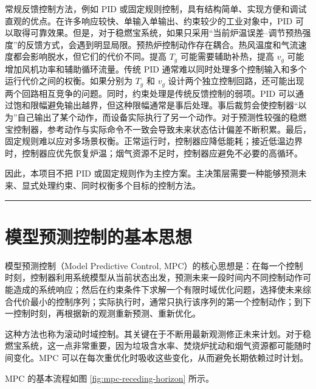 \documentclass[UTF8,openany,zihao=-4,oneside]{ctexbook}
\newcommand{\manualdivider}{\par\vspace{0.6em}\noindent\textcolor{FGLine}{\rule{\linewidth}{0.7pt}}\vspace{0.6em}\par}
\begin{document}
常规反馈控制方法，例如 PID 或固定规则控制，具有结构简单、实现方便和调试直观的优点。在许多响应较快、单输入单输出、约束较少的工业对象中，PID 可以取得可靠效果。但是，对于稳燃宝系统，如果只采用“当前炉温误差--调节预热强度”的反馈方式，会遇到明显局限。预热炉控制动作存在耦合。热风温度和气流速度都会影响脱水，但它们的代价不同。提高 \(T_g\) 可能需要辅助补热，提高 \(v_g\) 可能增加风机功率和辅助循环流量。传统 PID 通常难以同时处理多个控制输入和多个运行代价之间的权衡。如果分别为 \(T_g\) 和 \(v_g\) 设计两个独立控制回路，还可能出现两个回路相互竞争的问题。同时，约束处理是传统反馈控制的弱项。PID 可以通过饱和限幅避免输出越界，但这种限幅通常是事后处理。事后裁剪会使控制器“以为”自己输出了某个动作，而设备实际执行了另一个动作。对于预测性较强的稳燃宝控制器，参考动作与实际命令不一致会导致未来状态估计偏差不断积累。最后，固定规则难以应对多场景权衡。正常运行时，控制器应降低能耗；接近低温边界时，控制器应优先恢复炉温；烟气资源不足时，控制器应避免不必要的高循环。

因此，本项目不把 PID 或固定规则作为主控方案。主决策层需要一种能够预测未来、显式处理约束、同时权衡多个目标的控制方法。

\manualdivider

\section{模型预测控制的基本思想}\label{sec:mpc-basic-idea}

模型预测控制（Model Predictive Control, MPC）的核心思想是：在每一个控制时刻，控制器利用系统模型从当前状态出发，预测未来一段时间内不同控制动作可能造成的系统响应；然后在约束条件下求解一个有限时域优化问题，选择使未来综合代价最小的控制序列；实际执行时，通常只执行该序列的第一个控制动作；到下一控制时刻，再根据新的观测重新预测、重新优化。

这种方法也称为滚动时域控制。其关键在于不断用最新观测修正未来计划。对于稳燃宝系统，这一点非常重要，因为垃圾含水率、焚烧炉扰动和烟气资源都可能随时间变化。MPC 可以在每次重优化时吸收这些变化，从而避免长期依赖过时计划。

MPC 的基本流程如图 \ref{fig:mpc-receding-horizon} 所示。
\end{document}
